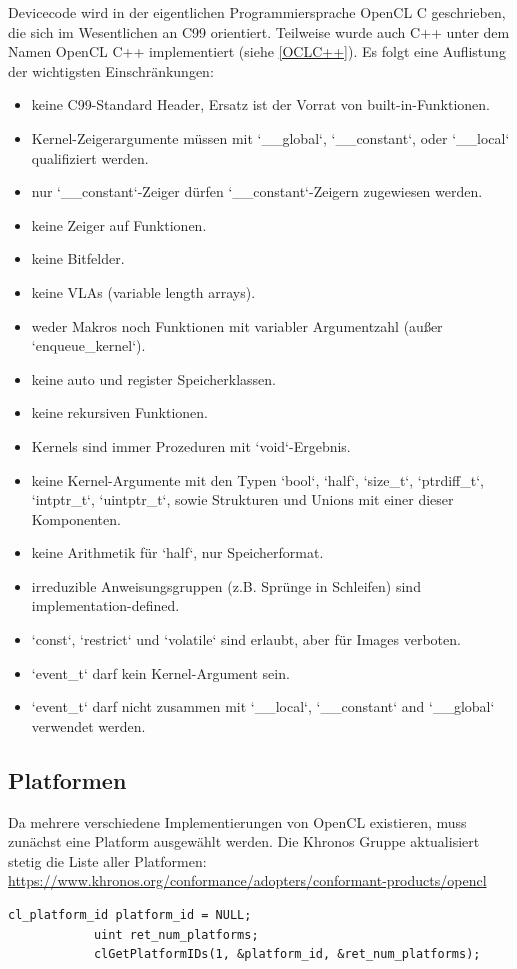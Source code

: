 		Devicecode wird in der eigentlichen Programmiersprache OpenCL C geschrieben, die sich im Wesentlichen an C99 orientiert. Teilweise wurde auch C++ unter dem Namen OpenCL C++ implementiert (siehe \ref{OCLC++}). Es folgt eine Auflistung der wichtigsten Einschränkungen:
		\begin{itemize}
		\item keine C99-Standard Header, Ersatz ist der Vorrat von built-in-Funktionen.
		\item Kernel-Zeigerargumente müssen mit \li`__global`, \li`__constant`, oder \li`__local` qualifiziert werden.  
		\item nur \li`__constant`-Zeiger dürfen \li`__constant`-Zeigern zugewiesen werden.
		\item keine Zeiger auf Funktionen.
		\item keine Bitfelder.
		\item keine VLAs (variable length arrays).
		\item weder Makros noch Funktionen mit variabler Argumentzahl (außer \li`enqueue_kernel`).
		\item keine auto und register Speicherklassen.
		\item keine rekursiven Funktionen.
		\item \Glspl{Kernel} sind immer Prozeduren mit \li`void`-Ergebnis.
		\item keine \Gls{Kernel}-Argumente mit den Typen \li`bool`, \li`half`, \li`size_t`, \li`ptrdiff_t`, \li`intptr_t`, \li`uintptr_t`, sowie Strukturen und Unions mit einer dieser Komponenten.
		\item keine Arithmetik für \li`half`, nur Speicherformat.
		\item irreduzible Anweisungsgruppen (z.B. Sprünge in Schleifen) sind implementation-defined.
		\item \li`const`, \li`restrict` und \li`volatile` sind erlaubt, aber für Images verboten.
		\item \li`event_t` darf kein \Gls{Kernel}-Argument sein.
		\item  \li`event_t` darf nicht zusammen mit \li`__local`, \li`__constant` and \li`__global` verwendet werden.
		\end{itemize}
		
			\subsection{Platformen}
			Da mehrere verschiedene Implementierungen von OpenCL existieren, muss zunächst eine \Gls{Platform} ausgewählt werden. Die Khronos Gruppe aktualisiert stetig die Liste aller Platformen: \url{https://www.khronos.org/conformance/adopters/conformant-products/opencl}
			\begin{lstlisting}[caption=Platformabfrage]
			cl_platform_id platform_id = NULL;
			uint ret_num_platforms;
			clGetPlatformIDs(1, &platform_id, &ret_num_platforms);
			\end{lstlisting}


